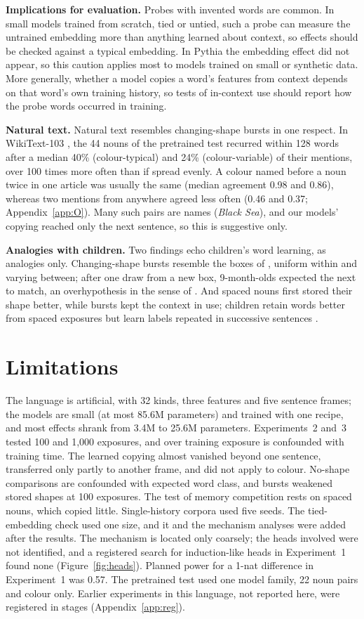 \documentclass[11pt]{article}
\begin{document}
\textbf{Implications for evaluation.} Probes with invented words are common. In small models trained from scratch, tied or untied, such a probe can measure the untrained embedding more than anything learned about context, so effects should be checked against a typical embedding. In Pythia the embedding effect did not appear, so this caution applies most to models trained on small or synthetic data. More generally, whether a model copies a word's features from context depends on that word's own training history, so tests of in-context use should report how the probe words occurred in training.

\textbf{Natural text.} Natural text resembles changing-shape bursts in one respect. In WikiText-103 \citep{merity2017}, the 44 nouns of the pretrained test recurred within 128 words after a median 40\% (colour-typical) and 24\% (colour-variable) of their mentions, over 100 times more often than if spread evenly. A colour named before a noun twice in one article was usually the same (median agreement 0.98 and 0.86), whereas two mentions from anywhere agreed less often (0.46 and 0.37; Appendix~\ref{app:O}). Many such pairs are names (\emph{Black Sea}), and our models' copying reached only the next sentence, so this is suggestive only.

\textbf{Analogies with children.} Two findings echo children's word learning, as analogies only. Changing-shape bursts resemble the boxes of \citet{dewar2010}, uniform within and varying between; after one draw from a new box, 9-month-olds expected the next to match, an overhypothesis in the sense of \citet{kemp2007}. And spaced nouns first stored their shape better, while bursts kept the context in use; children retain words better from spaced exposures \citep{childers2002,vlach2008} but learn labels repeated in successive sentences \citep{schwab2016}.

\section*{Limitations}
The language is artificial, with 32 kinds, three features and five sentence frames; the models are small (at most 85.6M parameters) and trained with one recipe, and most effects shrank from 3.4M to 25.6M parameters. Experiments~2 and~3 tested 100 and 1,000 exposures, and over training exposure is confounded with training time. The learned copying almost vanished beyond one sentence, transferred only partly to another frame, and did not apply to colour. No-shape comparisons are confounded with expected word class, and bursts weakened stored shapes at 100 exposures. The test of memory competition rests on spaced nouns, which copied little. Single-history corpora used five seeds. The tied-embedding check used one size, and it and the mechanism analyses were added after the results. The mechanism is located only coarsely; the heads involved were not identified, and a registered search for induction-like heads in Experiment~1 found none (Figure~\ref{fig:heads}). Planned power for a 1-nat difference in Experiment~1 was 0.57. The pretrained test used one model family, 22 noun pairs and colour only. Earlier experiments in this language, not reported here, were registered in stages (Appendix~\ref{app:reg}).
\end{document}
